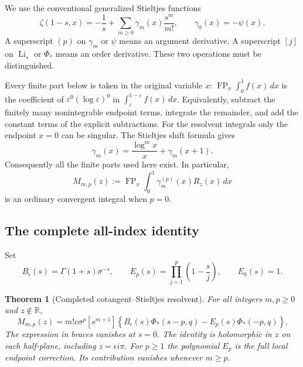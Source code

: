 \documentclass[11pt,a4paper]{article}
\numberwithin{equation}{section}
\newtheorem{theorem}{Theorem}[section]
\theoremstyle{definition}
\theoremstyle{remark}
\DeclareMathOperator{\Li}{Li}
\begin{document}
We use the conventional generalized Stieltjes functions
\begin{equation}\label{res:stieltjes}
 \zeta(1-s,x)=-\frac1s+
       \sum_{m\ge0}\gamma_m(x)\frac{s^m}{m!},\qquad
 \gamma_0(x)=-\psi(x).
\end{equation}
A superscript $(p)$ on $\gamma_m$ or $\psi$ means an argument
derivative. A superscript $[j]$ on $\Li_s$ or $\Phi_*$ means an order
derivative. These two operations must be distinguished.

Every finite part below is taken in the original variable $x$:
$\operatorname{FP}_x\int_0^1 f(x)\,dx$ is the coefficient of
$\varepsilon^0(\log\varepsilon)^0$ in
$\int_\varepsilon^{1-\varepsilon}f(x)\,dx$. Equivalently, subtract
the finitely many nonintegrable endpoint terms, integrate the
remainder, and add the constant terms of the explicit subtractions.
For the resolvent integrals only the endpoint $x=0$ can be singular.
The Stieltjes shift formula gives
\begin{equation}\label{res:singularpart}
 \gamma_m(x)=\frac{\log^m x}{x}+\gamma_m(x+1).
\end{equation}
Consequently all the finite parts used here exist. In particular,
\[
 M_{m,p}(z):=\operatorname{FP}_x\int_0^1\gamma_m^{(p)}(x)R_z(x)\,dx
\]
is an ordinary convergent integral when $p=0$.

\subsection{The complete all-index identity}

Set
\begin{equation}\label{res:BE}
 B_\epsilon(s)=\Gamma(1+s)\sigma^{-s},\qquad
 E_p(s)=\prod_{j=1}^p\left(1-\frac{s}{j}\right),\qquad E_0(s)=1.
\end{equation}

\begin{theorem}[Completed cotangent--Stieltjes resolvent]
\label{res:main}
For all integers $m,p\ge0$ and $z\notin\mathbb R$,
\begin{equation}\label{res:master}
 \boxed{\displaystyle
 M_{m,p}(z)=m!c\sigma^p[s^{m+1}]
 \left\{B_\epsilon(s)\Phi_*(s-p,q)
                   -E_p(s)\Phi_*(-p,q)\right\}.}
\end{equation}
The expression in braces vanishes at $s=0$. The identity is
holomorphic in $z$ on each half-plane, including $z=\epsilon i\pi$.
For $p\ge1$ the polynomial $E_p$ is the full local endpoint
correction. Its contribution vanishes whenever $m\ge p$.
\end{theorem}
\end{document}
